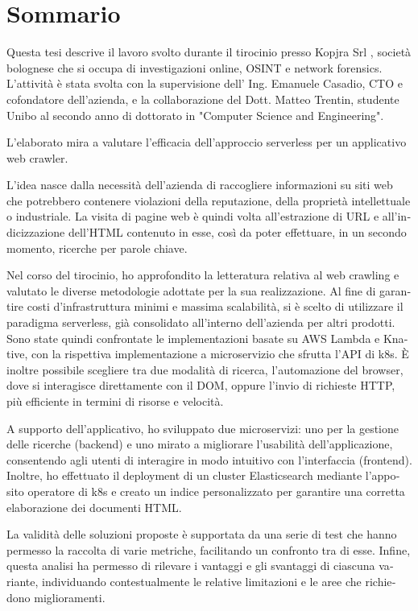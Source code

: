 \documentclass[../thesis.tex]{subfiles}
\begin{document}
    \chapter*{Sommario}
\begin{otherlanguage}{italian}
    Questa tesi descrive il lavoro svolto durante il tirocinio presso Kopjra Srl \cite{site:kopjra}, società bolognese che si occupa di investigazioni online, \acrshort{OSINT} e network forensics. L'attività è stata svolta con la supervisione dell' Ing. Emanuele Casadio, CTO e cofondatore dell'azienda, e la collaborazione del Dott. Matteo Trentin, studente Unibo al secondo anno di dottorato in "Computer Science and Engineering".
    
    L'elaborato mira a valutare l'efficacia dell'approccio serverless per un applicativo web crawler.
    
    L'idea nasce dalla necessità dell'azienda di raccogliere informazioni su siti web che potrebbero contenere violazioni della reputazione, della proprietà intellettuale o industriale. La visita di pagine web è quindi volta all'estrazione di \acrshort{URL} e all'indicizzazione dell'\acrshort{HTML} contenuto in esse, così da poter effettuare, in un secondo momento, ricerche per parole chiave. %
    
    Nel corso del tirocinio, ho approfondito la letteratura relativa al web crawling e valutato le diverse metodologie adottate per la sua realizzazione. Al fine di garantire costi d'infrastruttura minimi e massima scalabilità, si è scelto di utilizzare il paradigma serverless, già consolidato all'interno dell'azienda per altri prodotti. Sono state quindi confrontate le implementazioni basate su \acrshort{AWS} Lambda e Knative, con la rispettiva implementazione a microservizio che sfrutta l'\acrshort{API} di \gls{k8s}. \`E inoltre possibile scegliere tra due modalità di ricerca, l'automazione del browser, dove si interagisce direttamente con il \acrshort{DOM}, oppure l'invio di richieste \acrshort{HTTP}, più efficiente in termini di risorse e velocità.
    
    A supporto dell'applicativo, ho sviluppato due microservizi: uno per la gestione delle ricerche (backend) e uno mirato a migliorare l'usabilità dell'applicazione, consentendo agli utenti di interagire in modo intuitivo con l'interfaccia (frontend). Inoltre, ho effettuato il deployment di un cluster Elasticsearch mediante l'apposito operatore di \gls{k8s} e creato un indice personalizzato per garantire una corretta elaborazione dei documenti \acrshort{HTML}.
    
    La validità delle soluzioni proposte è supportata da una serie di test che hanno permesso la raccolta di varie metriche, facilitando un confronto tra di esse. Infine, questa analisi ha permesso di rilevare i vantaggi e gli svantaggi di ciascuna variante, individuando contestualmente le relative limitazioni e le aree che richiedono miglioramenti.
\end{otherlanguage}
\end{document}
